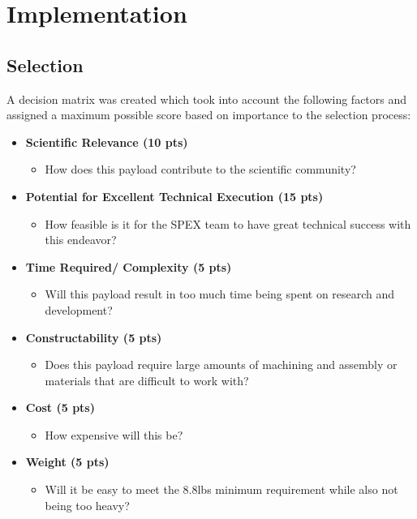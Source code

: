 \documentclass[conference]{IEEEtran} %
\begin{document}
\section{Implementation}
\label{sec:Implementation}

\subsection{Selection}
\label{subsec:Selection}
A decision matrix was created which took into account the following factors and assigned a maximum possible
score based on importance to the selection process:
\begin{itemize}
  \item \textbf{Scientific Relevance (10 pts)}
  \begin{itemize}
    \item How does this payload contribute to the scientific community?
  \end{itemize}

  \item \textbf{Potential for Excellent Technical Execution (15 pts)}
  \begin{itemize}
    \item How feasible is it for the SPEX team to have great technical success with this endeavor?
  \end{itemize}

  \item \textbf{Time Required/ Complexity (5 pts)}
  \begin{itemize}
    \item Will this payload result in too much time being spent on research and development?
  \end{itemize}

  \item \textbf{Constructability (5 pts)}
  \begin{itemize}
    \item Does this payload require large amounts of machining and assembly or materials that are difficult to work with?
  \end{itemize}

  \item \textbf{Cost (5 pts)}
  \begin{itemize}
    \item How expensive will this be?
  \end{itemize}

  \item \textbf{Weight (5 pts)}
  \begin{itemize}
    \item Will it be easy to meet the 8.8lbs minimum requirement while also not being too heavy?
  \end{itemize}


\end{itemize}
\end{document}
